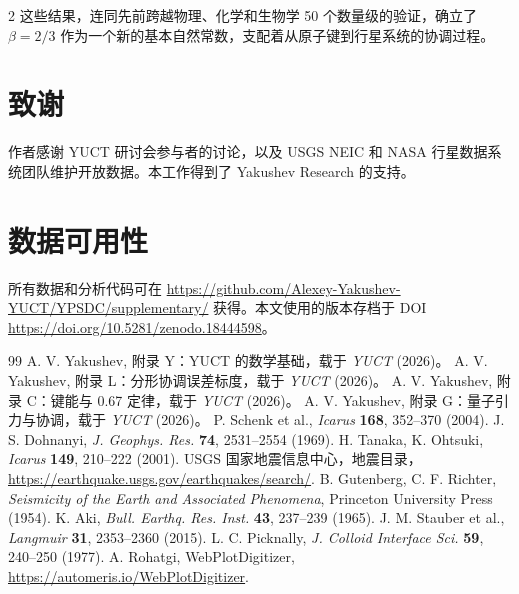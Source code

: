 \documentclass[11pt,a4paper]{article}
\newcommand{\betaf}{\beta}
\begin{document}
\begin{multicols}{2}
		这些结果，连同先前跨越物理、化学和生物学 50 个数量级的验证，确立了 \(\betaf = 2/3\) 作为一个新的基本自然常数，支配着从原子键到行星系统的协调过程。
		
		\section*{致谢}
		
		作者感谢 YUCT 研讨会参与者的讨论，以及 USGS NEIC 和 NASA 行星数据系统团队维护开放数据。本工作得到了 Yakushev Research 的支持。
		
		\section*{数据可用性}
		
		所有数据和分析代码可在 \url{https://github.com/Alexey-Yakushev-YUCT/YPSDC/supplementary/} 获得。本文使用的版本存档于 DOI \url{https://doi.org/10.5281/zenodo.18444598}。
		
		\begin{thebibliography}{99}
			 A. V. Yakushev, 附录 Y：YUCT 的数学基础，载于 \emph{YUCT} (2026)。
			 A. V. Yakushev, 附录 L：分形协调误差标度，载于 \emph{YUCT} (2026)。
			 A. V. Yakushev, 附录 C：键能与 0.67 定律，载于 \emph{YUCT} (2026)。
			 A. V. Yakushev, 附录 G：量子引力与协调，载于 \emph{YUCT} (2026)。
			 P. Schenk et al., \emph{Icarus} \textbf{168}, 352–370 (2004).
			 J. S. Dohnanyi, \emph{J. Geophys. Res.} \textbf{74}, 2531–2554 (1969).
			 H. Tanaka, K. Ohtsuki, \emph{Icarus} \textbf{149}, 210–222 (2001).
			 USGS 国家地震信息中心，地震目录，\url{https://earthquake.usgs.gov/earthquakes/search/}.
			 B. Gutenberg, C. F. Richter, \emph{Seismicity of the Earth and Associated Phenomena}, Princeton University Press (1954).
			 K. Aki, \emph{Bull. Earthq. Res. Inst.} \textbf{43}, 237–239 (1965).
			 J. M. Stauber et al., \emph{Langmuir} \textbf{31}, 2353–2360 (2015).
			 L. C. Picknally, \emph{J. Colloid Interface Sci.} \textbf{59}, 240–250 (1977).
			 A. Rohatgi, WebPlotDigitizer, \url{https://automeris.io/WebPlotDigitizer}.
		\end{thebibliography}
		
	\end{multicols}
\end{document}
